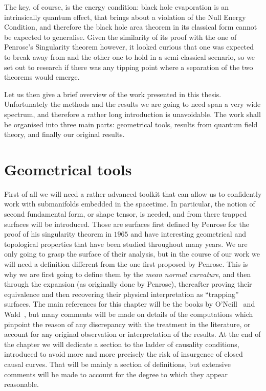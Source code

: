 The key, of course, is the energy condition: black hole evaporation is an intrinsically quantum effect, that brings about a violation of the Null Energy Condition, and therefore the black hole area theorem in its classical form cannot be expected to generalise. Given the similarity of its proof with the one of Penrose's Singularity theorem however, it looked curious that one was expected to break away from and the other one to hold in a semi-classical scenario, so we set out to research if there was any tipping point where a separation of the two theorems would emerge.

Let us then give a brief overview of the work presented in this thesis. Unfortunately the methods and the results we are going to need span a very wide spectrum, and therefore a rather long introduction is unavoidable. The work shall be organised into three main parts: geometrical tools, results from quantum field theory, and finally our original results.

\section{Geometrical tools}
First of all we will need a rather advanced toolkit that can allow us to confidently work with submanifolds embedded in the spacetime. In particular, the notion of second fundamental form, or shape tensor, is needed, and from there trapped surfaces will be introduced. Those are surfaces first defined by Penrose for the proof of his singularity theorem in \(1965\) and have interesting geometrical and topological properties that have been studied throughout many years. We are only going to grasp the surface of their analysis, but in the course of our work we will need a definition different from the one first proposed by Penrose. This is why we are first going to define them by the \emph{mean normal curvature}, and then through the expansion (as originally done by Penrose), thereafter proving their equivalence and then recovering their physical interpretation as ``trapping'' surfaces.
The main references for this chapter will be the books by O'Neill~\cite[]{o1983semi} and Wald~\cite[]{wald2010general}, but many comments will be made on details of the computations which pinpoint the reason of any discrepancy with the treatment in the literature, or account for any original observation or interpretation of the results.
At the end of the chapter we will dedicate a section to the ladder of causality conditions, introduced to avoid more and more precisely the risk of insurgence of closed causal curves. That will be mainly a section of definitions, but extensive comments will be made to account for the degree to which they appear reasonable.  


